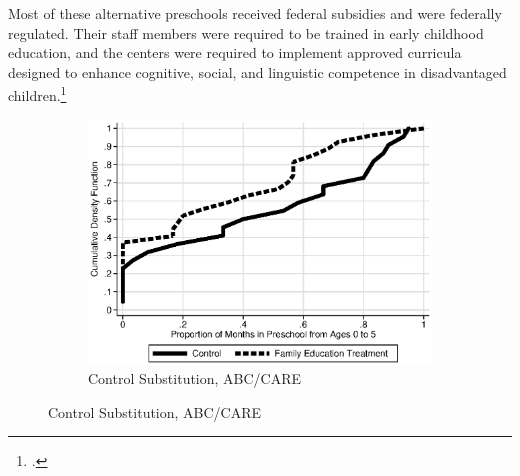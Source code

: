 Most of these alternative preschools received federal subsidies and were federally regulated. Their staff members were required to be trained in early childhood education, and the centers were required to implement approved curricula designed to enhance cognitive, social, and linguistic competence in disadvantaged children.\footnote{\citet{Burchinal_etal_1989_CD_Daycare-Pre-K-Dev}.} 

\begin{figure}[H]
\centering
\caption{Control Substitution Characteristics, ABC/CARE Control Group}\label{fig:control-sub}
\begin{subfigure}[h]{0.7\textwidth}
		\centering
		\caption{Control Substitution, ABC/CARE} \label{fig:treatsubcare}
		\includegraphics[width=\textwidth]{output/care_controlcontamination_months.eps}
\end{subfigure}


\end{figure}
